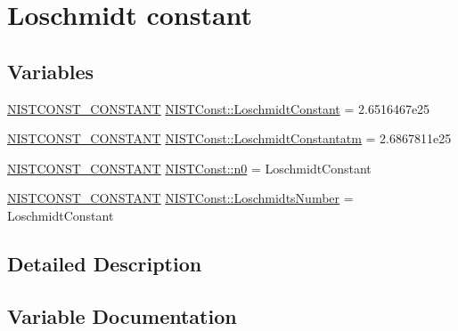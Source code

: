 \hypertarget{group___n_i_s_t_const-_loschmidt_constant}{}\section{Loschmidt constant}
\label{group___n_i_s_t_const-_loschmidt_constant}
\subsection*{Variables}
\begin{DoxyCompactItemize}
\item 
\mbox{\hyperlink{group___n_i_s_t_const-_macros_ga2b0fc1d7452373f816175dd86ce26729}{N\+I\+S\+T\+C\+O\+N\+S\+T\+\_\+\+C\+O\+N\+S\+T\+A\+NT}} \mbox{\hyperlink{group___n_i_s_t_const-_loschmidt_constant_ga513d27c989dc4f6f91e3aa37ca018d5a}{N\+I\+S\+T\+Const\+::\+Loschmidt\+Constant}} = 2.\+6516467e25
\item 
\mbox{\hyperlink{group___n_i_s_t_const-_macros_ga2b0fc1d7452373f816175dd86ce26729}{N\+I\+S\+T\+C\+O\+N\+S\+T\+\_\+\+C\+O\+N\+S\+T\+A\+NT}} \mbox{\hyperlink{group___n_i_s_t_const-_loschmidt_constant_gae68f5d2d04353bd4cf30faa8cb935734}{N\+I\+S\+T\+Const\+::\+Loschmidt\+Constantatm}} = 2.\+6867811e25
\item 
\mbox{\hyperlink{group___n_i_s_t_const-_macros_ga2b0fc1d7452373f816175dd86ce26729}{N\+I\+S\+T\+C\+O\+N\+S\+T\+\_\+\+C\+O\+N\+S\+T\+A\+NT}} \mbox{\hyperlink{group___n_i_s_t_const-_loschmidt_constant_ga057a58a522fa17fedca02a7508535bf4}{N\+I\+S\+T\+Const\+::n0}} = Loschmidt\+Constant
\item 
\mbox{\hyperlink{group___n_i_s_t_const-_macros_ga2b0fc1d7452373f816175dd86ce26729}{N\+I\+S\+T\+C\+O\+N\+S\+T\+\_\+\+C\+O\+N\+S\+T\+A\+NT}} \mbox{\hyperlink{group___n_i_s_t_const-_loschmidt_constant_gae01f2b75c0a0b05fd5421782598dbfee}{N\+I\+S\+T\+Const\+::\+Loschmidts\+Number}} = Loschmidt\+Constant
\end{DoxyCompactItemize}


\subsection{Detailed Description}


\subsection{Variable Documentation}
\mbox{\label{group___n_i_s_t_const-_loschmidt_constant_ga513d27c989dc4f6f91e3aa37ca018d5a}} 
